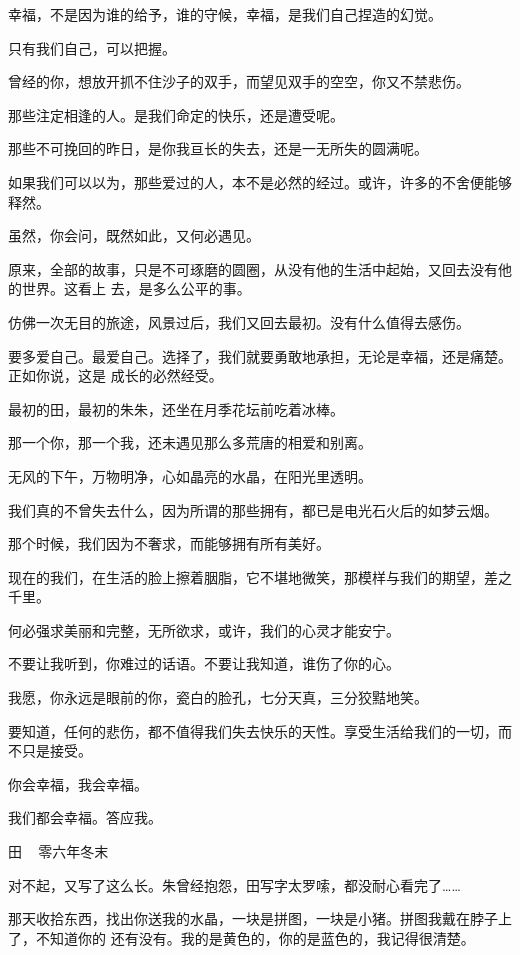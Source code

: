 \documentclass[12pt,a4paper]{article}
\def\blankrev{\vspace{1ex}}									%
\begin{document}
		幸福，不是因为谁的给予，谁的守候，幸福，是我们自己捏造的幻觉。\par
		只有我们自己，可以把握。\par
		曾经的你，想放开抓不住沙子的双手，而望见双手的空空，你又不禁悲伤。\par
		那些注定相逢的人。是我们命定的快乐，还是遭受呢。\par
		那些不可挽回的昨日，是你我亘长的失去，还是一无所失的圆满呢。\par
		如果我们可以以为，那些爱过的人，本不是必然的经过。或许，许多的不舍便能够释然。\par
		虽然，你会问，既然如此，又何必遇见。


		原来，全部的故事，只是不可琢磨的圆圈，从没有他的生活中起始，又回去没有他的世界。这看上
	去，是多么公平的事。

		仿佛一次无目的旅途，风景过后，我们又回去最初。没有什么值得去感伤。

		要多爱自己。最爱自己。选择了，我们就要勇敢地承担，无论是幸福，还是痛楚。正如你说，这是
	成长的必然经受。


		最初的田，最初的朱朱，还坐在月季花坛前吃着冰棒。\par
		那一个你，那一个我，还未遇见那么多荒唐的相爱和别离。\par
		无风的下午，万物明净，心如晶亮的水晶，在阳光里透明。\par
		我们真的不曾失去什么，因为所谓的那些拥有，都已是电光石火后的如梦云烟。

		那个时候，我们因为不奢求，而能够拥有所有美好。\par
		现在的我们，在生活的脸上擦着胭脂，它不堪地微笑，那模样与我们的期望，差之千里。\par
		何必强求美丽和完整，无所欲求，或许，我们的心灵才能安宁。\par
		不要让我听到，你难过的话语。不要让我知道，谁伤了你的心。\par
		我愿，你永远是眼前的你，瓷白的脸孔，七分天真，三分狡黠地笑。\par
		要知道，任何的悲伤，都不值得我们失去快乐的天性。享受生活给我们的一切，而不只是接受。

		你会幸福，我会幸福。\par
		我们都会幸福。答应我。


		\blankrev
		田 ~ 零六年冬末


		\blankrev \blankrev
		对不起，又写了这么长。朱曾经抱怨，田写字太罗嗦，都没耐心看完了……


		那天收拾东西，找出你送我的水晶，一块是拼图，一块是小猪。拼图我戴在脖子上了，不知道你的
	还有没有。我的是黄色的，你的是蓝色的，我记得很清楚。
\end{document}
